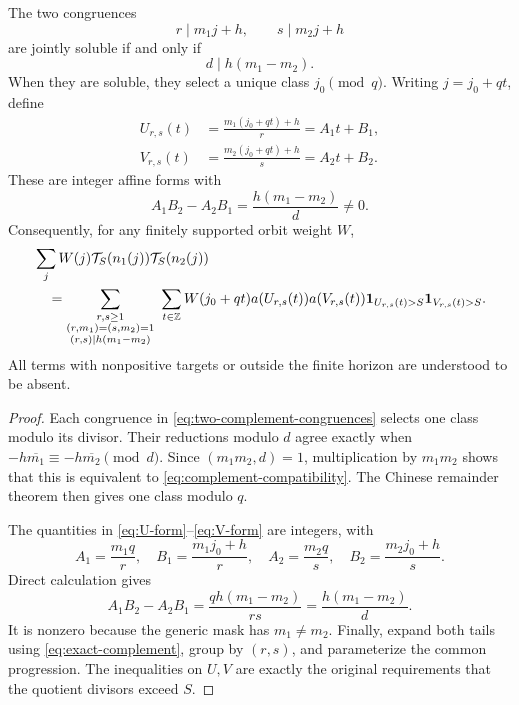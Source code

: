 \begin{theorem}
\label{thm:affine-complement-fiber}
The two congruences
\begin{equation}
 r\mid m_1j+h,
 \qquad s\mid m_2j+h
 \label{eq:two-complement-congruences}
\end{equation}
are jointly soluble if and only if
\begin{equation}
 d\mid h(m_1-m_2).
 \label{eq:complement-compatibility}
\end{equation}
When they are soluble, they select a unique class \(j_0\pmod q\).
Writing \(j=j_0+qt\), define
\begin{align}
 U_{r,s}(t)
 &=\frac{m_1(j_0+qt)+h}{r}=A_1t+B_1,
 \label{eq:U-form}\\
 V_{r,s}(t)
 &=\frac{m_2(j_0+qt)+h}{s}=A_2t+B_2.
 \label{eq:V-form}
\end{align}
These are integer affine forms with
\begin{equation}
 \boxed{
 A_1B_2-A_2B_1
 =\frac{h(m_1-m_2)}d\ne0.}
 \label{eq:affine-determinant}
\end{equation}
Consequently, for any finitely supported orbit weight \(W\),
\begin{align}
 &\sum_jW(j)\mathcal T_S(n_1(j))\mathcal T_S(n_2(j))
 \notag\\
 &\quad=
 \sum_{\substack{r,s\ge1\\(r,m_1)=(s,m_2)=1\\
                  (r,s)\mid h(m_1-m_2)}}
 \ \sum_{t\in\mathbb Z}
 W(j_0+qt)
 a(U_{r,s}(t))a(V_{r,s}(t))
 \mathbf 1_{U_{r,s}(t)>S}
 \mathbf 1_{V_{r,s}(t)>S}.
 \label{eq:exact-two-fiber-reassembly}
\end{align}
All terms with nonpositive targets or outside the finite horizon are
understood to be absent.
\end{theorem}

\begin{proof}
Each congruence in \eqref{eq:two-complement-congruences} selects one
class modulo its divisor.  Their reductions modulo \(d\) agree exactly
when
\(-h\overline{m_1}\equiv-h\overline{m_2}\pmod d\).  Since
\((m_1m_2,d)=1\), multiplication by \(m_1m_2\) shows that this is
equivalent to
\eqref{eq:complement-compatibility}.  The Chinese remainder theorem
then gives one class modulo \(q\).

The quantities in \eqref{eq:U-form}--\eqref{eq:V-form} are integers,
with
\[
 A_1=\frac{m_1q}{r},\quad
 B_1=\frac{m_1j_0+h}{r},\quad
 A_2=\frac{m_2q}{s},\quad
 B_2=\frac{m_2j_0+h}{s}.
\]
Direct calculation gives
\[
 A_1B_2-A_2B_1
 =\frac{qh(m_1-m_2)}{rs}
 =\frac{h(m_1-m_2)}d.
\]
It is nonzero because the generic mask has \(m_1\ne m_2\).
Finally, expand both tails using \eqref{eq:exact-complement}, group by
\((r,s)\), and parameterize the common progression.  The inequalities
on \(U,V\) are exactly the original requirements that the quotient
divisors exceed \(S\).
\end{proof}

